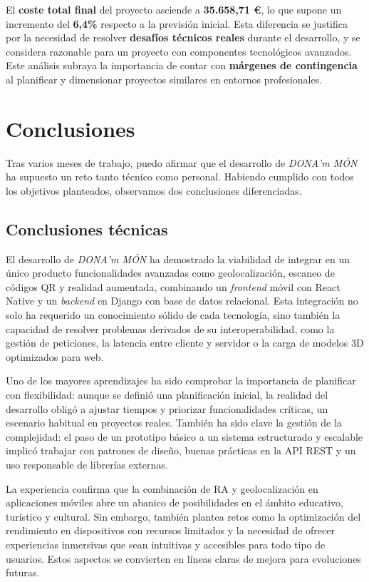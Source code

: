 El \textbf{coste total final} del proyecto asciende a \textbf{35.658,71 €}, lo que supone un incremento del \textbf{6,4\%} respecto a la previsión inicial. Esta diferencia se justifica por la necesidad de resolver \textbf{desafíos técnicos reales} durante el desarrollo, y se considera razonable para un proyecto con componentes tecnológicos avanzados. Este análisis subraya la importancia de contar con \textbf{márgenes de contingencia} al planificar y dimensionar proyectos similares en entornos profesionales.

\section{Conclusiones}

Tras varios meses de trabajo, puedo afirmar que el desarrollo de \textit{DONA'm MÓN} ha supuesto un reto tanto técnico como personal. Habiendo cumplido con todos los objetivos planteados, observamos dos conclusiones diferenciadas.


\subsection{Conclusiones técnicas}

El desarrollo de \textit{DONA'm MÓN} ha demostrado la viabilidad de integrar en un único producto funcionalidades avanzadas como geolocalización, escaneo de códigos QR y realidad aumentada, combinando un \textit{frontend} móvil con React Native y un \textit{backend} en Django con base de datos relacional. Esta integración no solo ha requerido un conocimiento sólido de cada tecnología, sino también la capacidad de resolver problemas derivados de su interoperabilidad, como la gestión de peticiones, la latencia entre cliente y servidor o la carga de modelos 3D optimizados para web.

Uno de los mayores aprendizajes ha sido comprobar la importancia de planificar con flexibilidad: aunque se definió una planificación inicial, la realidad del desarrollo obligó a ajustar tiempos y priorizar funcionalidades críticas, un escenario habitual en proyectos reales. También ha sido clave la gestión de la complejidad: el paso de un prototipo básico a un sistema estructurado y escalable implicó trabajar con patrones de diseño, buenas prácticas en la API REST y un uso responsable de librerías externas.

La experiencia confirma que la combinación de RA y geolocalización en aplicaciones móviles abre un abanico de posibilidades en el ámbito educativo, turístico y cultural. Sin embargo, también plantea retos como la optimización del rendimiento en dispositivos con recursos limitados y la necesidad de ofrecer experiencias inmersivas que sean intuitivas y accesibles para todo tipo de usuarios. Estos aspectos se convierten en líneas claras de mejora para evoluciones futuras.




